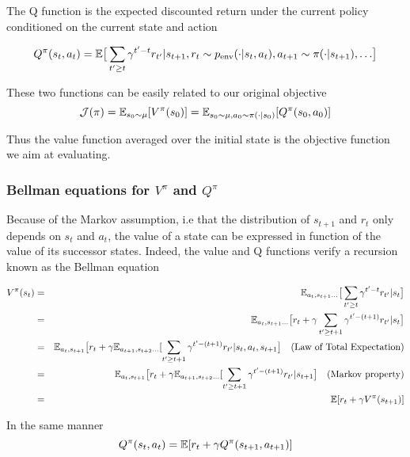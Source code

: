 The Q function is the expected discounted return under the current policy conditioned on the current state and action

\begin{equation}
    Q^\pi(s_t, a_t) = \mathbb{E} \big[ \sum_{t' \ge t} \gamma^{t'-t} r_{t'} | {s_{t+1}, r_t \sim p_{\text{env}}(\cdot | s_t, a_t), a_{t+1} \sim \pi(\cdot|s_{t+1}), \dots} \big] 
\end{equation}

These two functions can be easily related to our original objective
$${\mathcal{J}}(\pi) = \mathbb{E}_{s_0 \sim \mu} [ V^\pi(s_0)] = \mathbb{E}_{s_0 \sim \mu, a_0 \sim \pi(\cdot | s_0)} [ Q^\pi(s_0, a_0)]$$

Thus the value function averaged over the initial state is the objective function we aim at evaluating.



\subsubsection{Bellman equations for $V^\pi$ and $Q^\pi$}
\label{subsec:bellman_eq}
Because of the Markov assumption, i.e that the distribution of $s_{t+1}$ and $r_t$ only depends on $s_t$ and $a_t$, the value of a state can be expressed in function of the value of its successor states. Indeed, the value and Q functions verify a recursion known as the Bellman equation

\begin{eqnarray}
    V^\pi(s_t) &=& \mathbb{E}_{a_t, s_{t+1} \dots} \big[ \sum_{t' \ge t} \gamma^{t'-t} r_{t'} | s_t \big] \nonumber\\
    &=&  \mathbb{E}_{a_t, s_{t+1} \dots} \big[ r_t + \gamma \sum_{t' \ge t+1} \gamma^{t'-(t+1)} r_{t'} | s_t \big]\nonumber\\
     &=&  \mathbb{E}_{a_t, s_{t+1}
} \big[ r_t + \gamma \mathbb{E}_{a_{t+1}, s_{t+2} \dots} [\sum_{t' \ge t+1} \gamma^{t'-(t+1)} r_{t'} | s_t, a_t, s_{t+1} \big] \quad \text{(Law of Total Expectation)}\nonumber\\
    &=&  \mathbb{E}_{a_t, s_{t+1}} \big[ r_t + \gamma \mathbb{E}_{a_{t+1}, s_{t+2} \dots} [\sum_{t' \ge t+1} \gamma^{t'-(t+1)} r_{t'} | s_{t+1} \big] \quad \text{(Markov property)}\nonumber\\
    &=& \mathbb{E} [r_t + \gamma V^\pi(s_{t+1})]
\end{eqnarray}


In the same manner
\begin{equation}
\label{eq:expected_bellman}
    Q^\pi(s_t, a_t) =  \mathbb{E} [r_t + \gamma Q^\pi(s_{t+1}, a_{t+1})]
\end{equation}


